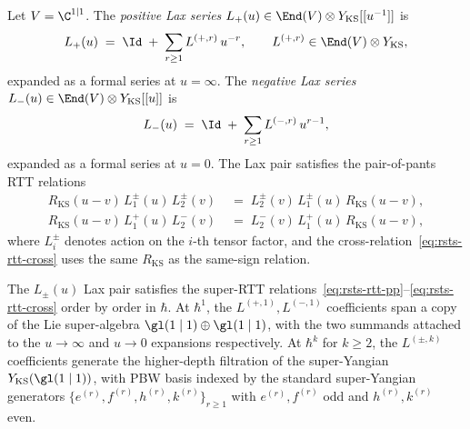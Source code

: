 \begin{definition}
\label{def:L-pm-lax-pair}
Let $V = \C^{1 \mid 1}$. The \emph{positive Lax series}
$L_+(u) \in \End(V) \otimes Y_{\mathrm{KS}}[[u^{-1}]]$ is
\[
 L_+(u) \;=\; \Id \;+\; \sum_{r \geq 1} L^{(+, r)}\, u^{-r},
 \qquad L^{(+, r)} \in \End(V) \otimes Y_{\mathrm{KS}},
\]
expanded as a formal series at $u = \infty$. The \emph{negative Lax
series} $L_-(u) \in \End(V) \otimes Y_{\mathrm{KS}}[[u]]$ is
\[
 L_-(u) \;=\; \Id \;+\; \sum_{r \geq 1} L^{(-, r)}\, u^{r-1},
\]
expanded as a formal series at $u = 0$. The Lax pair satisfies the
pair-of-pants RTT relations
\begin{align}
\label{eq:rsts-rtt-pp}
 R_{\mathrm{KS}}(u - v)\, L^\pm_1(u)\, L^\pm_2(v)
 \;&=\; L^\pm_2(v)\, L^\pm_1(u)\, R_{\mathrm{KS}}(u - v), \\
\label{eq:rsts-rtt-cross}
 R_{\mathrm{KS}}(u - v)\, L^+_1(u)\, L^-_2(v)
 \;&=\; L^-_2(v)\, L^+_1(u)\, R_{\mathrm{KS}}(u - v),
\end{align}
where $L^\pm_i$ denotes action on the $i$-th tensor factor, and the
cross-relation~\eqref{eq:rsts-rtt-cross} uses the same $R_{\mathrm{KS}}$
as the same-sign relation.
\end{definition}

\begin{theorem}
\label{thm:super-rtt-closure}
The $L_\pm(u)$ Lax pair satisfies the super-RTT
relations~\eqref{eq:rsts-rtt-pp}--\eqref{eq:rsts-rtt-cross} order by
order in $\hbar$. At $\hbar^1$, the $L^{(+, 1)}, L^{(-, 1)}$
coefficients span a copy of the Lie super-algebra
$\gl(1 \mid 1) \oplus \gl(1 \mid 1)$, with the two summands attached
to the $u \to \infty$ and $u \to 0$ expansions respectively. At
$\hbar^k$ for $k \geq 2$, the $L^{(\pm, k)}$ coefficients generate the
higher-depth filtration of the super-Yangian
$Y_{\mathrm{KS}}(\gl(1 \mid 1))$, with PBW basis indexed by the
standard super-Yangian generators $\{e^{(r)}, f^{(r)}, h^{(r)},
k^{(r)}\}_{r \geq 1}$ with $e^{(r)}, f^{(r)}$ odd and $h^{(r)}, k^{(r)}$
even.
\end{theorem}

